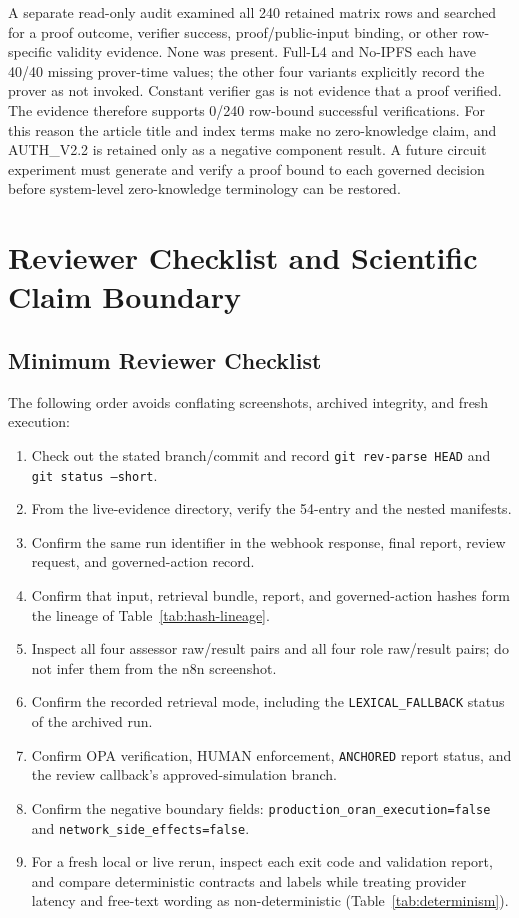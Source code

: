 \documentclass[journal]{IEEEtran}
\newcommand{\artifactpath}[1]{\path{#1}}
\begin{document}
A separate read-only audit examined all 240 retained matrix rows and searched
for a proof outcome, verifier success, proof/public-input binding, or other
row-specific validity evidence. None was present. Full-L4 and No-IPFS each
have 40/40 missing prover-time values; the other four variants explicitly
record the prover as not invoked. Constant verifier gas is not evidence that a
proof verified. The evidence therefore supports 0/240 row-bound successful
verifications. For this reason the article title and index terms make no
zero-knowledge claim, and AUTH\_V2.2 is retained only as a negative component
result. A future circuit experiment must generate and verify a proof bound to
each governed decision before system-level zero-knowledge terminology can be
restored.

\section{Reviewer Checklist and Scientific Claim Boundary}
\label{sec:checklist}

\subsection{Minimum Reviewer Checklist}
The following order avoids conflating screenshots, archived integrity, and
fresh execution:
\begin{enumerate}
\item Check out the stated branch/commit and record
\texttt{git rev-parse HEAD} and \texttt{git status --short}.
\item From the live-evidence directory, verify the 54-entry
\artifactpath{SHA256SUMS.txt} and the nested manifests.
\item Confirm the same run identifier in the webhook response, final report,
review request, and governed-action record.
\item Confirm that input, retrieval bundle, report, and governed-action hashes
form the lineage of Table~\ref{tab:hash-lineage}.
\item Inspect all four assessor raw/result pairs and all four role raw/result
pairs; do not infer them from the n8n screenshot.
\item Confirm the recorded retrieval mode, including the
\texttt{LEXICAL\_FALLBACK} status of the archived run.
\item Confirm OPA verification, HUMAN enforcement, \texttt{ANCHORED} report
status, and the review callback's approved-simulation branch.
\item Confirm the negative boundary fields:
\texttt{production\_oran\_execution=false} and
\texttt{network\_side\_effects=false}.
\item For a fresh local or live rerun, inspect each exit code and validation
report, and compare deterministic contracts and labels while treating provider
latency and free-text wording as non-deterministic
(Table~\ref{tab:determinism}).
\end{enumerate}
\end{document}
